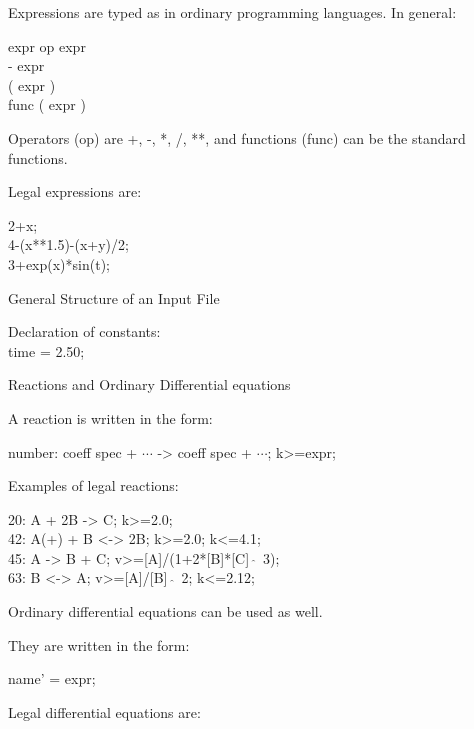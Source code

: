 \newpage
Expressions are typed as in ordinary programming languages. In general:

\vspace{.5cm}
expr op expr \\
- expr \\
( expr ) \\
func ( expr )

\vspace{.5cm}
Operators (op) are +, -, *, /, **, and functions (func) can be
the standard functions. 

\vspace{.5cm}
Legal expressions are:

2+x;\\
4-(x**1.5)-(x+y)/2;\\
3+exp(x)*sin(t);

\newpage
\begin{center}
General Structure of an Input File
\end{center}


\vspace{2cm}
Declaration of constants:\\
time = 2.50;
 
\newpage
\begin{center}
Reactions and Ordinary Differential equations
\end{center}

A reaction is written in the form:

number: coeff spec + $\cdots$ -> coeff spec + $\cdots$; k>=expr;

\vspace{.5cm}
Examples of legal reactions:

20: A + 2B -> C; k>=2.0;\\
42: A(+) + B <-> 2B; k>=2.0; k<=4.1;\\
45: A -> B + C; v>=[A]/(1+2*[B]*[C]\ $\hat{}$\ 3);\\
63: B <-> A; v>=[A]/[B]\ $\hat{}$\ 2; k<=2.12;

\vspace{3cm}
Ordinary differential equations can be used as well. 

They are written in the form:

\vspace{.25cm}
name' = expr;

\vspace{.5cm}
Legal differential equations are:

